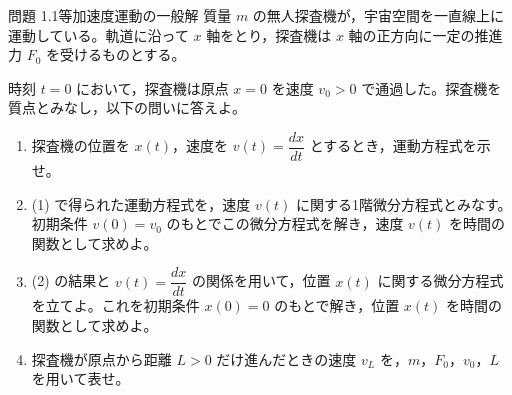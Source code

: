 
\begin{problemBox}{問題 1.1\quad 等加速度運動の一般解\hspace{1.2em}{\small\mdseries 〔基本〕}}
質量 $m$ の無人探査機が，宇宙空間を一直線上に運動している。軌道に沿って $x$ 軸をとり，探査機は $x$ 軸の正方向に一定の推進力 $F_0$ を受けるものとする。

時刻 $t=0$ において，探査機は原点 $x=0$ を速度 $v_0>0$ で通過した。探査機を質点とみなし，以下の問いに答えよ。

\begin{enumerate}
  \item 探査機の位置を $x(t)$，速度を
  $v(t)=\dfrac{dx}{dt}$ とするとき，運動方程式を示せ。

  \item (1) で得られた運動方程式を，速度 $v(t)$ に関する1階微分方程式とみなす。初期条件 $v(0)=v_0$ のもとでこの微分方程式を解き，速度 $v(t)$ を時間の関数として求めよ。

  \item (2) の結果と $v(t)=\dfrac{dx}{dt}$ の関係を用いて，位置 $x(t)$ に関する微分方程式を立てよ。これを初期条件 $x(0)=0$ のもとで解き，位置 $x(t)$ を時間の関数として求めよ。

  \item 探査機が原点から距離 $L>0$ だけ進んだときの速度 $v_L$ を，$m$，$F_0$，$v_0$，$L$ を用いて表せ。
\end{enumerate}
\end{problemBox}

